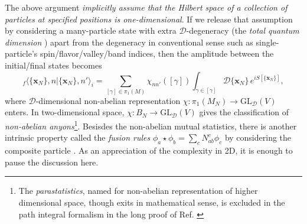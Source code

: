 \begin{itemize}
          The above argument \emph{implicitly assume that the Hilbert space of a collection of particles at specified positions is one-dimensional}. If we release that assumption by considering a many-particle state with extra $\mathcal D$-degeneracy (the \emph{total quantum dimension} \cite{kitaev2006topological,levin2006detecting}) apart from the degeneracy in conventional sense such as single-particle's spin/flavor/valley/band indices, then the amplitude between the initial/final states becomes
          \begin{equation*}
              _f\langle\{\bm x_N\},n|\{\bm x_N\},n'\rangle_i=\sum_{[\gamma]\in\pi_1(M)}\chi_{nn'}([\gamma])\int_{\gamma\in[\gamma]}\mathcal D\{\bm x_N\}\, e^{iS[\{\bm x_N\}]},
          \end{equation*}
          where $\mathcal D$-dimensional non-abelian representation $\chi:\pi_1(M_N)\rightarrow\mathrm{GL}_{\mathcal D}(V)$ enters. In two-dimensional space, $\chi: B_N\rightarrow\mathrm{GL}_{\mathcal D}(V)$ gives the classification of \emph{non-abelian anyons}\footnote{The \emph{parastatistics}, named for non-abelian representation of higher dimensional space, though exits in mathematical sense, is excluded in the path integral formalism in the long proof of Ref. \cite{laidlaw1971feynman}}. Besisdes the non-abelian mutual statistics, there is another intrinsic property called the \emph{fusion rules} $\phi_a\star\phi_b=\sum_c N^c_{ab}\phi_c$ by considering the composite particle . As an appreciation of the complexity in 2D, it is enough to pause the discussion here.


\end{itemize}
